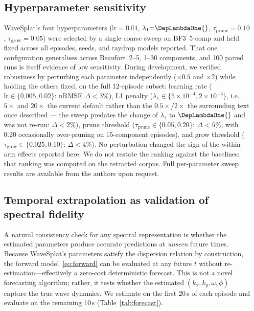 \subsection{Hyperparameter sensitivity}
\label{sec:hyper}

WaveSplat's four hyperparameters ($\text{lr}{=}0.01$,
$\lambda_1{=}\DepLambdaOne{}$, $\tau_{\text{prune}}{=}0.10$,
$\tau_{\text{grow}}{=}0.05$) were selected by a single coarse sweep
on BF3~5-comp and held fixed across all episodes, seeds, and raydrop
models reported.  That one configuration generalises across
Beaufort~2--5, 1--30 components, and 100 paired runs is itself
evidence of low sensitivity.
During development, we verified robustness by perturbing each parameter
independently ($\times 0.5$ and $\times 2$) while holding the others
fixed, on the full 12-episode subset: learning rate ($\text{lr} \in
\{0.005, 0.02\}$: nRMSE $\Delta < 3\%$), L1 penalty
($\lambda_1 \in \{5\!\times\!10^{-4}, 2\!\times\!10^{-3}\}$, i.e.\ $5\times$ and
$20\times$ the current default rather than the $0.5\times$/$2\times$ the surrounding
text once described --- the sweep predates the change of $\lambda_1$ to
$\DepLambdaOne{}$ and was not re-run:
$\Delta < 2\%$), prune threshold ($\tau_{\text{prune}} \in \{0.05,
0.20\}$: $\Delta < 5\%$, with 0.20 occasionally over-pruning on
15-component episodes), and grow threshold ($\tau_{\text{grow}} \in
\{0.025, 0.10\}$: $\Delta < 4\%$).
No perturbation changed the sign of the within-arm effects reported here. We do not restate the ranking against the baselines: that ranking was computed on the retracted corpus.  Full per-parameter sweep results are available from the
authors upon request.


\subsection{Temporal extrapolation as validation of spectral fidelity}
\label{sec:forecast}

A natural consistency check for any spectral representation is whether
the estimated parameters produce accurate predictions at \emph{unseen}
future times.  Because WaveSplat's parameters satisfy the dispersion
relation by construction, the forward model~\eqref{eq:forward} can be
evaluated at any future $t$ without re-estimation---effectively a
zero-cost deterministic forecast.  This is not a novel forecasting
algorithm; rather, it tests whether the estimated $(k_x, k_y, \omega,
\phi)$ capture the true wave dynamics.
We estimate on the first 20\,s of each episode and evaluate on the
remaining 10\,s (Table~\ref{tab:forecast}).

